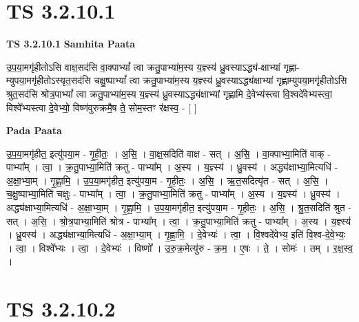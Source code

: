 \documentclass[17pt]{extarticle}
\begin{document}
\section*{ TS 3.2.10.1 }

\textbf{TS 3.2.10.1 } \newline
\textbf{Samhita Paata} \newline

उ॒प॒या॒मगृ॑हीतोऽसि वाक्ष॒सद॑सि वा॒क्पाभ्यां᳚ त्वा क्रतु॒पाभ्या॑म॒स्य य॒ज्ञ्स्य॑ ध्रु॒वस्याऽद्ध्य॑-क्षाभ्यां गृह्णा-म्युपया॒मगृ॑हीतोऽस्यृत॒सद॑सि चक्षु॒ष्पाभ्यां᳚ त्वा क्रतु॒पाभ्या॑म॒स्य य॒ज्ञ्स्य॑ ध्रु॒वस्याऽद्ध्य॑क्षाभ्यां गृह्णाम्युपया॒मगृ॑हीतोऽसि श्रुत॒सद॑सि श्रोत्र॒पाभ्यां᳚ त्वा क्रतु॒पाभ्या॑म॒स्य य॒ज्ञ्स्य॑ ध्रु॒वस्याऽद्ध्य॑क्षाभ्यां गृह्णामि दे॒वेभ्य॑स्त्वा वि॒श्वदे॑वेभ्यस्त्वा॒ विश्वे᳚भ्यस्त्वा दे॒वेभ्यो॒ विष्ण॑वुरुक्रमै॒ष ते॒ सोम॒स्तꣳ र॑क्षस्व॒ - [  ] \newline

\textbf{Pada Paata} \newline

उ॒प॒या॒मगृ॑हीत॒ इत्यु॑पया॒म - गृ॒ही॒तः॒ । अ॒सि॒ । वा॒क्ष॒सदिति॑ वाक्ष - सत् । अ॒सि॒ । वा॒क्पाभ्या॒मिति॑ वाक् - पाभ्या᳚म् । त्वा॒ । क्र॒तु॒पाभ्या॒मिति॑ क्रतु - पाभ्या᳚म् । अ॒स्य । य॒ज्ञ्स्य॑ । ध्रु॒वस्य॑ । अद्ध्य॑क्षाभ्या॒मित्यधि॑ - अ॒क्षा॒भ्या॒म् । गृ॒ह्णा॒मि॒ । उ॒प॒या॒मगृ॑हीत॒ इत्यु॑पया॒म - गृ॒ही॒तः॒ । अ॒सि॒ । ऋ॒त॒सदित्यृ॑त - सत् । अ॒सि॒ । च॒क्षु॒ष्पाभ्या॒मिति॑ चक्षुः - पाभ्या᳚म् । त्वा॒ । क्र॒तु॒पाभ्या॒मिति॑ क्रतु - पाभ्या᳚म् । अ॒स्य । य॒ज्ञ्स्य॑ । ध्रु॒वस्य॑ । अद्ध्य॑क्षाभ्या॒मित्यधि॑ - अ॒क्षा॒भ्या॒म् । गृ॒ह्णा॒मि॒ । उ॒प॒या॒मगृ॑हीत॒ इत्यु॑पया॒म - गृ॒ही॒तः॒ । अ॒सि॒ । श्रु॒त॒सदिति॑ श्रुत - सत् । अ॒सि॒ । श्रो॒त्र॒पाभ्या॒मिति॑ श्रोत्र - पाभ्या᳚म् । त्वा॒ । क्र॒तु॒पाभ्या॒मिति॑ क्रतु - पाभ्या᳚म् । अ॒स्य । य॒ज्ञ्स्य॑ । ध्रु॒वस्य॑ । अद्ध्य॑क्षाभ्या॒मित्यधि॑ - अ॒क्षा॒भ्या॒म् । गृ॒ह्णा॒मि॒ । दे॒वेभ्यः॑ । त्वा॒ । वि॒श्वदे॑वेभ्य॒ इति॑ वि॒श्व-दे॒वे॒भ्यः॒ । त्वा॒ । विश्वे᳚भ्यः । त्वा॒ । दे॒वेभ्यः॑ । विष्णो᳚ । उ॒रु॒क्र॒मेत्यु॑रु - क्र॒म॒ । ए॒षः । ते॒ । सोमः॑ । तम् । र॒क्ष॒स्व॒ ।  \newline




\section*{ TS 3.2.10.2 }
\end{document}
